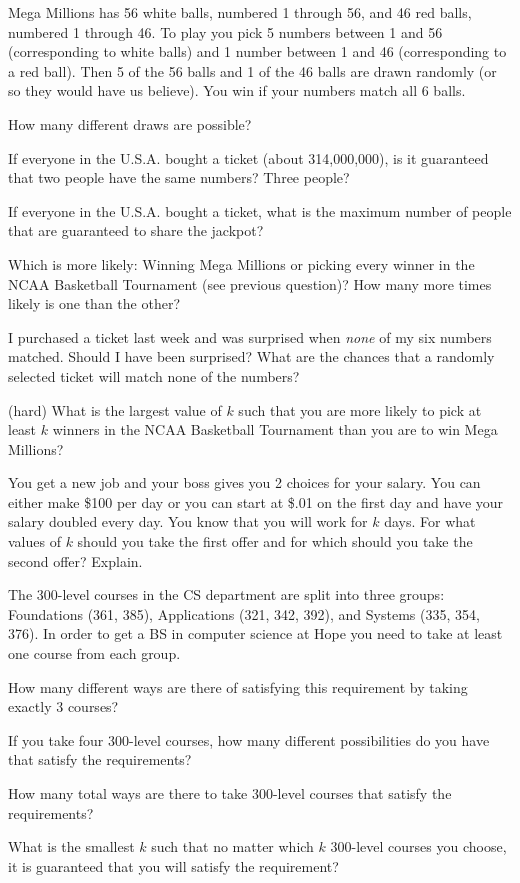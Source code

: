 \begin{pro}
Mega Millions has 56 white balls, numbered 1 through 56, and 46 red balls, numbered 1 through 46.  
To play you pick 5 numbers between 1 and 56 (corresponding to white balls) and 1 number between 1 and 46
(corresponding to a red ball).  Then 5 of the 56 balls and 1 of the 46 balls are drawn
randomly (or so they would have us believe).  You win if your numbers match all 6 balls.
\begin{lenum}
\item
How many different draws are possible?
\item
If everyone in the U.S.A. bought a ticket (about 314,000,000), is it guaranteed that two people have the
same numbers?  Three people?
\item
If everyone in the U.S.A. bought a ticket, what is the maximum number of people 
that are guaranteed to share the jackpot?
\item
Which is more likely: Winning Mega Millions or picking every winner in the NCAA Basketball Tournament
(see previous question)?  How many more times likely is one than the other?
\item
I purchased a ticket last week and was surprised when {\em none} of my six numbers matched.  
Should I have been surprised?  
What are the chances that a randomly selected ticket will match none of the numbers?
\item
(hard) What is the largest value of $k$ such that you are more likely to pick at least $k$ winners in the 
NCAA Basketball Tournament than you are to win Mega Millions?
\end{lenum}
\end{pro}

\begin{pro}
You get a new job and your boss gives you 2 choices for your salary.  You can either make \$100 per day
or you can start at \$.01 on the first day and have your salary doubled every day.  You know that you will
work for $k$ days.  For what values of $k$ should you take the first offer and for
which should you take the second offer?  Explain.
\end{pro}

\begin{pro}\label{prob:csCourses}
The 300-level courses in the CS department are split into three groups: Foundations (361, 385), 
Applications (321, 342, 392), and Systems (335, 354, 376).  
In order to get a BS in computer science at Hope you need to take at least one course from
each group.
\begin{lenum}
\item
How many different ways are there of satisfying this requirement by taking exactly 3 courses?
\item
If you take four 300-level courses, 
how many different possibilities do you have that satisfy the requirements?
\item 
How many total ways are there to take 300-level courses that satisfy the requirements?
\item
What is the smallest $k$ such that no matter which $k$ 300-level courses you choose,
it is guaranteed that you will satisfy the requirement?
\end{lenum}
\end{pro}

